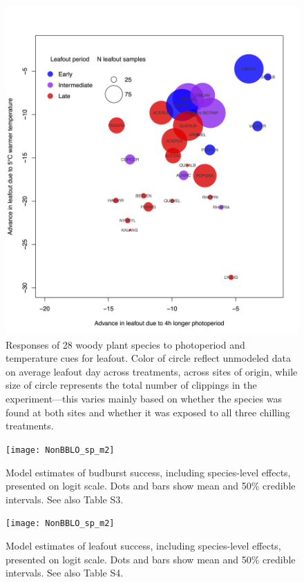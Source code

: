 \documentclass{article}
\begin{document}
\begin{figure} 
\begin{center}
\includegraphics[scale=0.5]{Advplot2.png}
\caption{Responses of 28 woody plant species to photoperiod and temperature cues for leafout. Color of circle reflect unmodeled data on average leafout day across treatments, across sites of origin, while size of circle represents the total number of clippings in the experiment---this varies mainly based on whether the species was found at both sites and whether it was exposed to all three chilling treatments. } %
\label{fig:fig1}
\end{center}
\end{figure}

\begin{figure}
\label{fig:figS8}
\texttt{[image: NonBBLO\_sp\_m2]} %
\caption{Model estimates of budburst success, including species-level effects, presented on logit scale. Dots and bars show mean and 50\% credible intervals. See also Table S3.}
\end{figure}

\begin{figure}
\label{fig:figS9}
\texttt{[image: NonBBLO\_sp\_m2]}
\caption{Model estimates of leafout success, including species-level effects, presented on logit scale. Dots and bars show mean and 50\% credible intervals. See also Table S4.}
\end{figure}
\end{document}
